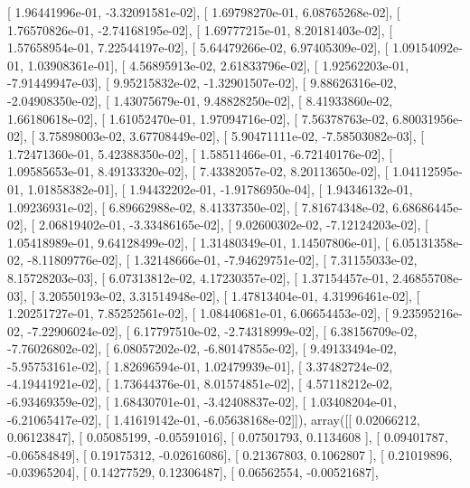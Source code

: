 \documentclass{article}
\begin{document}
       [  1.96441996e-01,  -3.32091581e-02],
       [  1.69798270e-01,   6.08765268e-02],
       [  1.76570826e-01,  -2.74168195e-02],
       [  1.69777215e-01,   8.20181403e-02],
       [  1.57658954e-01,   7.22544197e-02],
       [  5.64479266e-02,   6.97405309e-02],
       [  1.09154092e-01,   1.03908361e-01],
       [  4.56895913e-02,   2.61833796e-02],
       [  1.92562203e-01,  -7.91449947e-03],
       [  9.95215832e-02,  -1.32901507e-02],
       [  9.88626316e-02,  -2.04908350e-02],
       [  1.43075679e-01,   9.48828250e-02],
       [  8.41933860e-02,   1.66180618e-02],
       [  1.61052470e-01,   1.97094716e-02],
       [  7.56378763e-02,   6.80031956e-02],
       [  3.75898003e-02,   3.67708449e-02],
       [  5.90471111e-02,  -7.58503082e-03],
       [  1.72471360e-01,   5.42388350e-02],
       [  1.58511466e-01,  -6.72140176e-02],
       [  1.09585653e-01,   8.49133320e-02],
       [  7.43382057e-02,   8.20113650e-02],
       [  1.04112595e-01,   1.01858382e-01],
       [  1.94432202e-01,  -1.91786950e-04],
       [  1.94346132e-01,   1.09236931e-02],
       [  6.89662988e-02,   8.41337350e-02],
       [  7.81674348e-02,   6.68686445e-02],
       [  2.06819402e-01,  -3.33486165e-02],
       [  9.02600302e-02,  -7.12124203e-02],
       [  1.05418989e-01,   9.64128499e-02],
       [  1.31480349e-01,   1.14507806e-01],
       [  6.05131358e-02,  -8.11809776e-02],
       [  1.32148666e-01,  -7.94629751e-02],
       [  7.31155033e-02,   8.15728203e-03],
       [  6.07313812e-02,   4.17230357e-02],
       [  1.37154457e-01,   2.46855708e-03],
       [  3.20550193e-02,   3.31514948e-02],
       [  1.47813404e-01,   4.31996461e-02],
       [  1.20251727e-01,   7.85252561e-02],
       [  1.08440681e-01,   6.06654453e-02],
       [  9.23595216e-02,  -7.22906024e-02],
       [  6.17797510e-02,  -2.74318999e-02],
       [  6.38156709e-02,  -7.76026802e-02],
       [  6.08057202e-02,  -6.80147855e-02],
       [  9.49133494e-02,  -5.95753161e-02],
       [  1.82696594e-01,   1.02479939e-01],
       [  3.37482724e-02,  -4.19441921e-02],
       [  1.73644376e-01,   8.01574851e-02],
       [  4.57118212e-02,  -6.93469359e-02],
       [  1.68430701e-01,  -3.42408837e-02],
       [  1.03408204e-01,  -6.21065417e-02],
       [  1.41619142e-01,  -6.05638168e-02]]), array([[ 0.02066212,  0.06123847],
       [ 0.05085199, -0.05591016],
       [ 0.07501793,  0.1134608 ],
       [ 0.09401787, -0.06584849],
       [ 0.19175312, -0.02616086],
       [ 0.21367803,  0.1062807 ],
       [ 0.21019896, -0.03965204],
       [ 0.14277529,  0.12306487],
       [ 0.06562554, -0.00521687],
\end{document}
